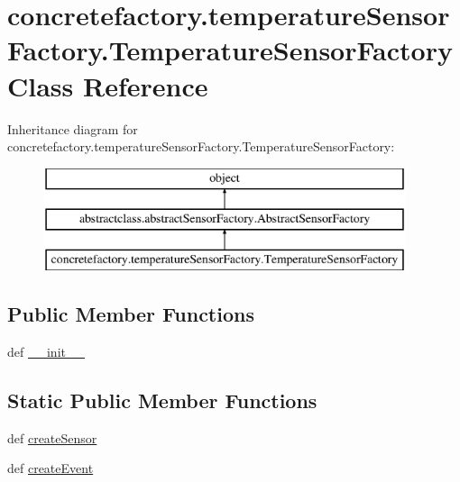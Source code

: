 \hypertarget{classconcretefactory_1_1temperatureSensorFactory_1_1TemperatureSensorFactory}{}\section{concretefactory.\+temperature\+Sensor\+Factory.\+Temperature\+Sensor\+Factory Class Reference}
\label{classconcretefactory_1_1temperatureSensorFactory_1_1TemperatureSensorFactory}
Inheritance diagram for concretefactory.\+temperature\+Sensor\+Factory.\+Temperature\+Sensor\+Factory\+:\begin{figure}[H]
\begin{center}
\leavevmode
\includegraphics[height=3.000000cm]{classconcretefactory_1_1temperatureSensorFactory_1_1TemperatureSensorFactory}
\end{center}
\end{figure}
\subsection*{Public Member Functions}
\begin{DoxyCompactItemize}
\item 
def \hyperlink{classconcretefactory_1_1temperatureSensorFactory_1_1TemperatureSensorFactory_ab5124b091297514d0d0ee185f2a120d2}{\+\_\+\+\_\+init\+\_\+\+\_\+}
\end{DoxyCompactItemize}
\subsection*{Static Public Member Functions}
\begin{DoxyCompactItemize}
\item 
def \hyperlink{classconcretefactory_1_1temperatureSensorFactory_1_1TemperatureSensorFactory_a10da40452b9fced7f217c6716e8d5ecc}{create\+Sensor}
\item 
def \hyperlink{classconcretefactory_1_1temperatureSensorFactory_1_1TemperatureSensorFactory_a1a774f01c56394abf98e4b4f44e7b25f}{create\+Event}
\end{DoxyCompactItemize}


